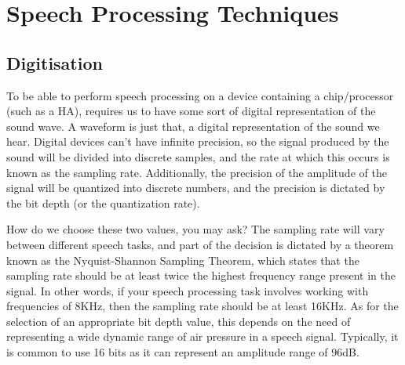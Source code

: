 \documentclass[logo,bsc,singlespacing,parskip,online]{infthesis}
\begin{document}

\section{Speech Processing Techniques}
\subsection{Digitisation}
To be able to perform speech processing on a device containing a chip/processor (such as a HA), requires us 
to have some sort of digital representation of the sound wave. A waveform is just that, a digital representation 
of the sound we hear. Digital devices can't have infinite precision, so the signal produced by the sound will 
be divided into discrete samples, and the rate at which this occurs is known as the sampling rate. Additionally,
the precision of the amplitude of the signal will be quantized into discrete numbers, and the precision is 
dictated by the bit depth (or the quantization rate).

How do we choose these two values, you may ask? The sampling 
rate will vary between different speech tasks, and part of the decision 
is dictated by a theorem known as the Nyquist-Shannon Sampling Theorem, 
which states that the sampling rate should be at least twice the 
highest frequency range present in the signal. In other words, 
if your speech processing task involves working with frequencies 
of 8KHz, then the sampling rate should be at least 16KHz.
As for the selection of an appropriate bit depth value, 
this depends on the need of representing a wide dynamic range 
of air pressure in a speech signal. Typically, it is 
common to use 16 bits as it can represent an amplitude range of 96dB.
\end{document}
